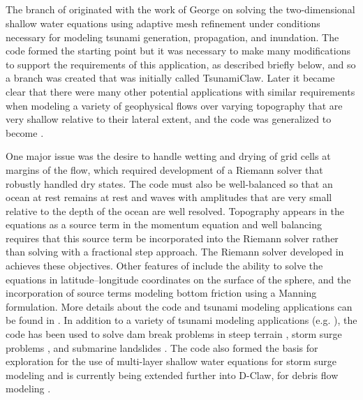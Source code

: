 %
%
%

\subsection{\geoclaw} 

The \geoclaw branch of \clawpack originated with the work of George
\cite{dgeorge:masters, dgeorge:phd, dgeorge:jcp} 
on solving the
two-dimensional shallow water equations using adaptive mesh refinement under
conditions necessary for modeling tsunami generation, propagation, and
inundation.
The \amrclaw code formed the starting point but it was necessary to make many 
modifications to support the requirements of this application, as described
briefly below, and so a branch was created that was initially called
TsunamiClaw.  Later it became clear that there were many other potential
applications with similar requirements when modeling a variety of
geophysical flows over varying topography that are very shallow 
relative to their lateral extent,
and the code was generalized to become \geoclaw.  

One major issue was the desire to handle wetting and drying of grid cells at
margins of the flow, which required development of a Riemann solver that
robustly handled dry states.  The code must also be well-balanced so that an
ocean at rest remains at rest and waves with amplitudes that are very small
relative to the depth of the ocean are well resolved.  Topography appears in
the equations as a source term in the momentum equation and well balancing
requires that this source term be incorporated into the Riemann solver
rather than solving with a fractional step approach.  The Riemann solver
developed in \cite{dgeorge:phd, dgeorge:jcp} achieves these objectives.
Other features of \geoclaw include the ability to solve the equations in
latitude--longitude coordinates on the surface of the sphere, and the
incorporation of source terms modeling bottom friction using a Manning
formulation.
More details about the code and tsunami modeling applications can be found
in \cite{BergerGeorgeLeVequeMandli:awr11, LeVequeGeorgeBerger:an11}. 
In addition to a variety of tsunami modeling applications (e.g. \cite{??}),
the \geoclaw code has been used to solve dam break problems in steep terrain
\cite{George:Malpasset}, storm surge problems \cite{Mandli:ws},
and submarine landslides \cite{??}.  The code also
formed the basis for exploration for the use of 
multi-layer shallow water equations for storm surge modeling
\cite{mandli:phd, Mandli:2011te} 
and is currently being extended further into D-Claw, for debris flow modeling 
\cite{Iverson:2014dc,George:2014gh}.

